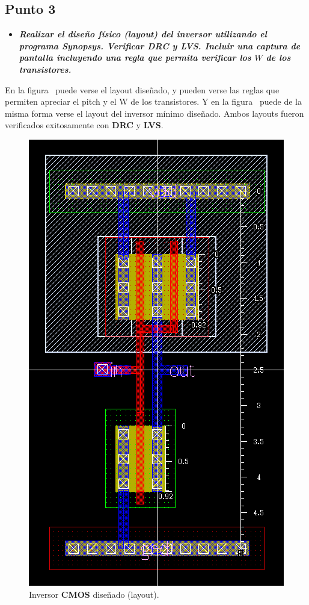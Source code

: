 
\subsection{Punto \textbf{3}}

\begin{itemize}
\item \emph{\textbf{Realizar el diseño físico (layout) del inversor utilizando el programa Synopsys. Verificar DRC y LVS. Incluir una captura de pantalla incluyendo una regla que permita verificar los $W$ de los transistores.}}
\end{itemize}


En la figura~ puede verse el layout diseñado, y pueden verse las reglas que permiten apreciar el pitch y el W de los transistores. Y en la figura~ puede de la misma forma verse el layout del inversor mínimo diseñado. Ambos layouts fueron verificados exitosamente con \textbf{DRC} y \textbf{LVS}.



\begin{figure}[H] %
\begin{center}
\includegraphics[width=0.45 \textwidth, angle=0]{./img/point3/TEST_LOGIC_GATES_Inverter_layout}
\caption{\label{fig:fig_inverter_layout}\footnotesize{Inversor \textbf{CMOS} diseñado (layout).}}
\end{center}
\end{figure}

\vfill
\clearpage


